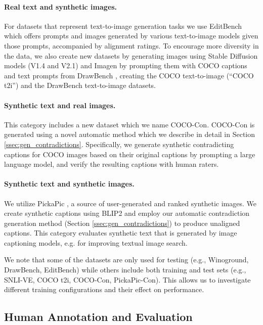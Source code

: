 \documentclass{article}
\begin{document}
\paragraph{Real text and synthetic images.} For datasets that represent text-to-image generation tasks we use EditBench \citep{wang2022imagen} which offers prompts and images generated by various text-to-image models given those prompts, accompanied by alignment ratings. To encourage more diversity in the data, we also create new datasets by generating images using Stable Diffusion models \citep{rombach2022high} (V1.4 and V2.1) and Imagen \citep{saharia2022photorealistic} by prompting them with COCO \citep{lin2014microsoft} captions and text prompts from DrawBench \citep{saharia2022photorealistic}, creating the COCO text-to-image (``COCO t2i'') and the DrawBench text-to-image datasets.

\paragraph{Synthetic text and real images.} This category includes a new dataset which we name COCO-Con. COCO-Con is generated using a novel automatic method which we describe in detail in Section \ref{ssec:gen_contradictions}. Specifically, we generate synthetic contradicting captions for COCO images based on their original captions by prompting a large language model, and verify the resulting captions with human raters.

\paragraph{Synthetic text and synthetic images.} We utilize PickaPic \cite{kirstain2023pickapic}, a source of user-generated and ranked synthetic images. We create synthetic captions using BLIP2 \citep{li2023blip} and employ our automatic contradiction generation method (Section \ref{ssec:gen_contradictions}) to produce unaligned captions. This category evaluates synthetic text that is generated by image captioning models, e.g. for improving textual image search. 

We note that some of the datasets are only used for testing (e.g., Winoground, DrawBench, EditBench) while others include both training and test sets (e.g., SNLI-VE, COCO t2i, COCO-Con, PickaPic-Con). This allows us to investigate different training configurations and their effect on performance.


\subsection{Human Annotation and Evaluation}
\label{sec:human_annotation}
\end{document}
